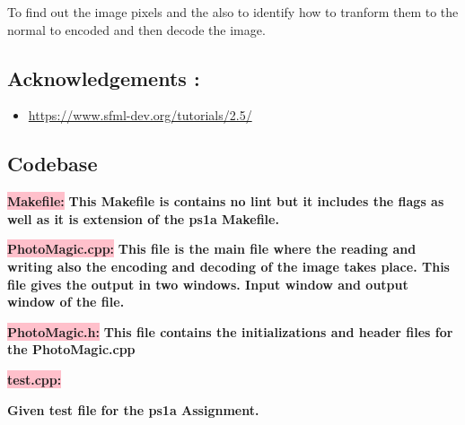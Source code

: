 To find out the image pixels and the also to identify how to tranform them to the normal to encoded and then decode the image.

\subsection{Acknowledgements :}\label{sec:ps1b:ack}
\begin{itemize}
    \item \url{https://www.sfml-dev.org/tutorials/2.5/}
\end{itemize}
\newpage

\subsection{Codebase}\label{sec:ps1b:code}

\colorbox{pink}{\textbf{Makefile:}} \newline \textbf{This Makefile is contains no lint but it includes the flags as well as it is extension of the ps1a Makefile.}



\colorbox{pink}{\textbf{PhotoMagic.cpp:}} \newline \textbf{This file is the main file where the reading and writing also the encoding and decoding of the image takes place. This file gives the output in two windows. Input window and output window of the file.}


\colorbox{pink}{\textbf{PhotoMagic.h:}}
\newline \textbf{This file contains the initializations and header files for the PhotoMagic.cpp}

\newpage

\colorbox{pink}{\textbf{test.cpp:}}
\newline

\textbf{Given test file for the ps1a Assignment.}


\newpage

